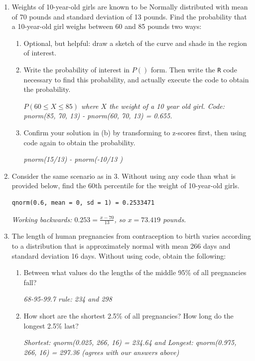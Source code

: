 \documentclass[12pt]{article}   	%
\newcommand{\soln}[2]{\textit{\textcolor{custom_red}{#2}}}{}
\begin{document}
\begin{enumerate}
\item
  Weights of 10-year-old girls are known to be Normally distributed with
  mean of 70 pounds and standard deviation of 13 pounds. Find the
  probability that a 10-year-old girl  weighs between 60 and 85
  pounds two ways:

  \begin{enumerate}
  \item
    Optional, but helpful: draw a sketch of the curve and shade in the
    region of interest.
  \item
    Write the probability of interest in \(P()\) form. Then write the
    \texttt{R} code necessary to find this probability, and actually
    execute the code to obtain the probability.
    
    \soln{}{$P(60 \leq X \leq 85)$ where $X$ the weight of a 10 year old girl. Code: pnorm(85, 70, 13) - pnorm(60, 70, 13) = 0.655.}
    
  \item
    Confirm your solution in (b) by transforming to z-scores first, then
    using code again to obtain the probability.
    
    \soln{}{pnorm(15/13) - pnorm(-10/13 ) }
  \end{enumerate}
\item
  Consider the same scenario as in 3. Without using any code than what
  is provided below, find the 60th percentile for the weight of
  10-year-old girls.

\begin{verbatim}
qnorm(0.6, mean = 0, sd = 1) = 0.2533471
\end{verbatim}

	\soln{}{Working backwards: $0.253 = \frac{x - 70}{13}$, so $x = 73.419$ pounds.}

\item
  The length of human pregnancies from contraception to birth varies
  according to a distribution that is approximately normal with mean 266
  days and standard deviation 16 days. Without using code, obtain the
  following:

  \begin{enumerate}
  \item
    Between what values do the lengths of the middle 95\% of all
    pregnancies fall?
    
    \soln{}{68-95-99.7 rule: 234 and 298}
  \item
    How short are the shortest 2.5\% of all pregnancies? How long do the
    longest 2.5\% last?
    
    \soln{}{Shortest: qnorm(0.025, 266, 16) = 234.64 and Longest: qnorm(0.975, 266, 16) = 297.36 (agrees with our answers above)}
  \end{enumerate}
\end{enumerate}
\end{document}
